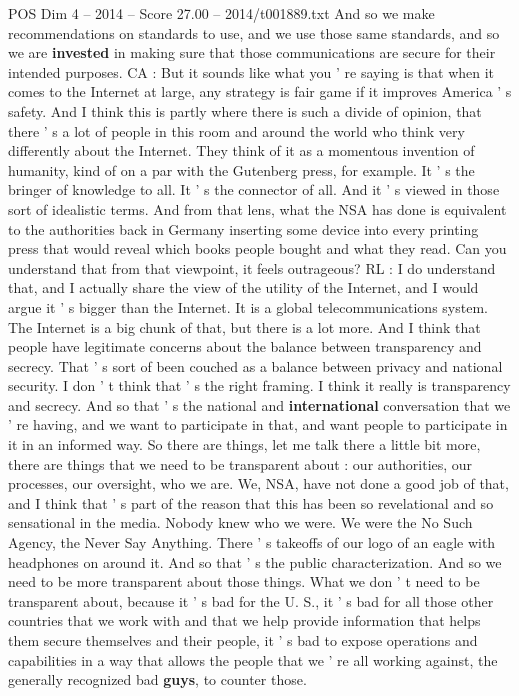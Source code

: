\begin{textsample}{POS Dim 4 – 2014 – Score 27.00 – 2014/t001889.txt}
And so we make recommendations on standards to use, and we use those same standards, and so we are \textbf{invested} in making sure that those communications are secure for their intended purposes.
CA : But it sounds like what you ' re saying is that when it comes to the Internet at large, any strategy is fair game if it improves America ' s safety.
And I think this is partly where there is such a divide of opinion, that there ' s a lot of people in this room and around the world who think very differently about the Internet.
They think of it as a momentous invention of humanity, kind of on a par with the Gutenberg press, for example.
It ' s the bringer of knowledge to all.
It ' s the connector of all.
And it ' s viewed in those sort of idealistic terms.
And from that lens, what the NSA has done is equivalent to the authorities back in Germany inserting some device into every printing press that would reveal which books people bought and what they read.
Can you understand that from that viewpoint, it feels outrageous?
RL : I do understand that, and I actually share the view of the utility of the Internet, and I would argue it ' s bigger than the Internet.
It is a global telecommunications system.
The Internet is a big chunk of that, but there is a lot more.
And I think that people have legitimate concerns about the balance between transparency and secrecy.
That ' s sort of been couched as a balance between privacy and national security.
I don ' t think that ' s the right framing.
I think it really is transparency and secrecy.
And so that ' s the national and \textbf{international} conversation that we ' re having, and we want to participate in that, and want people to participate in it in an informed way.
So there are things, let me talk there a little bit more, there are things that we need to be transparent about : our authorities, our processes, our oversight, who we are.
We, NSA, have not done a good job of that, and I think that ' s part of the reason that this has been so revelational and so sensational in the media.
Nobody knew who we were.
We were the No Such Agency, the Never Say Anything.
There ' s takeoffs of our logo of an eagle with headphones on around it.
And so that ' s the public characterization.
And so we need to be more transparent about those things.
What we don ' t need to be transparent about, because it ' s bad for the U.
S., it ' s bad for all those other countries that we work with and that we help provide information that helps them secure themselves and their people, it ' s bad to expose operations and capabilities in a way that allows the people that we ' re all working against, the generally recognized bad \textbf{guys}, to counter those.

\end{textsample}
